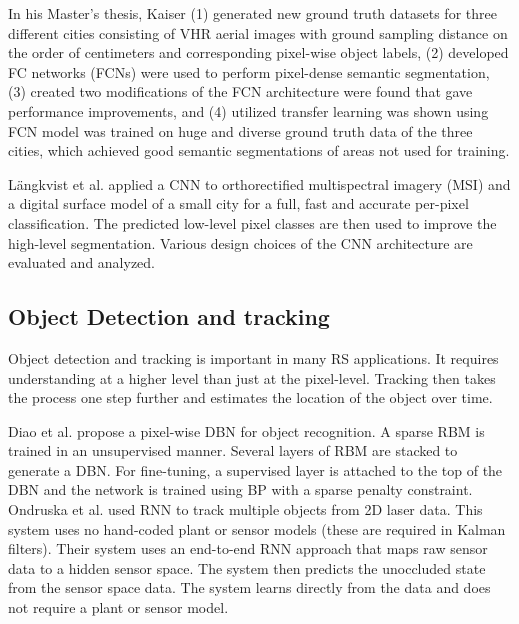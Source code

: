 \documentclass[12pt]{spieman}
\begin{document}
\begin{spacing}{1}
In his Master's thesis, Kaiser \cite{Kaiser2016Learning} (1) generated new ground truth datasets for three different cities consisting of VHR aerial images with ground sampling distance on the order of centimeters and corresponding pixel-wise object labels, (2) developed FC networks (FCNs) were used to perform pixel-dense semantic segmentation, (3) created two modifications of the FCN architecture were found that gave performance improvements, and (4) utilized transfer learning was shown using FCN model was trained on huge and diverse ground truth data of the three cities, which achieved good semantic segmentations of areas not used for training.

L{\"{a}}ngkvist et al. \cite{Langkvist2016Classification} applied a CNN to orthorectified multispectral imagery (MSI) and a digital surface model of a small city for a full, fast and accurate per-pixel classification. The predicted low-level pixel classes are then used to improve the high-level segmentation. Various design choices of the CNN architecture are evaluated and analyzed.

\subsection{Object Detection and tracking}


Object detection and tracking is important in many RS applications. It requires understanding at a higher level than just at the pixel-level. Tracking then takes the process one step further and estimates the location of the object over time.

Diao et al. \cite{diao2015object} propose a pixel-wise DBN for object recognition. A sparse RBM is trained in an unsupervised manner. Several layers of RBM are stacked to generate a DBN. For fine-tuning, a supervised layer is attached to the top of the DBN and the network is trained using BP with a sparse penalty constraint. Ondruska et al. \cite{Ondruska2016Deep} used RNN to track multiple objects from 2D laser data. This system uses no hand-coded plant or sensor models (these are required in Kalman filters). Their system uses an end-to-end RNN approach that maps raw sensor data to a hidden sensor space. The system then predicts the unoccluded state from the sensor space data. The system learns directly from the data and does not require a plant or sensor model.


\end{spacing}
\end{document}
